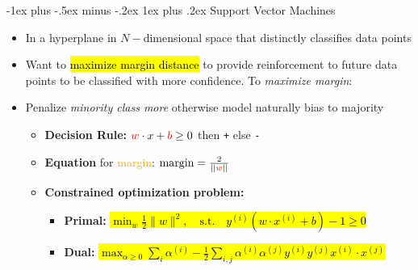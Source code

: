 \documentclass[10pt,landscape]{article}
\makeatletter
\renewcommand{\subsubsection}{\@startsection{subsubsection}{3}{0mm}%
                                {-1ex plus -.5ex minus -.2ex}%
                                {1ex plus .2ex}%
                                {\normalfont\small\bfseries}}
\makeatother
\begin{document}
\begin{multicols*}{3}
\subsubsection{Support Vector Machines}
\begin{itemize}[topsep=0pt,noitemsep,wide=0pt, leftmargin=\dimexpr{} + 2\relax]
  \item In a hyperplane in $N-$dimensional space that distinctly classifies data points
  \item Want to \hl{maximize margin distance} to provide reinforcement to future data points to be classified with more confidence. To \textit{maximize margin}:
  \item Penalize \textit{minority class more} otherwise model naturally bias to majority
  \begin{itemize}[topsep=0pt,noitemsep,wide=0pt, leftmargin=\dimexpr{} + 2\relax]
    \item \textbf{Decision Rule:} $\textcolor{red}{w} \cdot x + \textcolor{red}{b} \geq 0$ then \verb|+| else \verb|-|
    \item \textbf{Equation} for \textcolor{orange}{margin}: $\text{margin} = \frac{2}{||\textcolor{red}{w}||}$
    \item \textbf{Constrained optimization problem:} 
    \noindent{}
    \begin{itemize}[topsep=0pt,noitemsep,wide=0pt, leftmargin=\dimexpr{} + 2\relax]
      \item \textbf{Primal:}
      \hl{$ \min_{w} \frac{1}{2} \| w \|^2, \quad \text{s.t.} \quad y^{(i)} \left( w \cdot x^{(i)} + b \right) - 1 \geq 0$}
      
      \item \textbf{Dual:} \hl{$\max_{\alpha \geq 0} \sum_i \alpha^{(i)} - \frac{1}{2} \sum_{i,j} \alpha^{(i)} \alpha^{(j)} y^{(i)} y^{(j)} x^{(i)} \cdot x^{(j)}$}
    \end{itemize}
  \end{itemize}
\end{itemize}



\end{multicols*}
\end{document}
